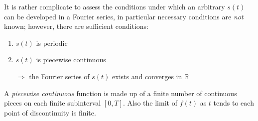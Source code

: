 It is rather complicate to assess the conditions under which an arbitrary $s(t)$ can be developed in a Fourier series, in particular necessary conditions are \textit{not} known; however, there are sufficient conditions:
\begin{theorem}[Dirichlet]
   \begin{enumerate}
      \item $s(t)$ is periodic
      \item $s(t)$ is piecewise continuous
      \item[$\Rightarrow$] the Fourier series of $s(t)$ exists and converges in $\mathbb{R}$
   \end{enumerate}
   \end{theorem}
A \textit{piecewise continuous} function is made up of a finite number of continuous pieces on each finite subinterval $[0,T]$. Also the
limit of $f(t)$ as $t$ tends to each point of discontinuity is finite.

